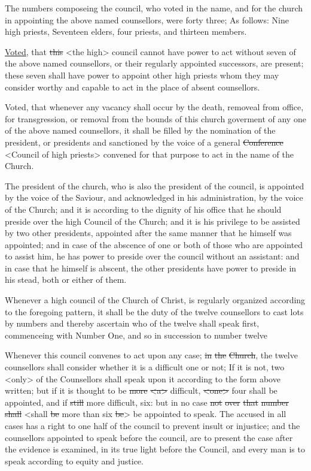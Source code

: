 					The numbers composeing the council, who voted in the name, and for the church in appointing the above named counsellors, were forty three; As follows: Nine high priests, Seventeen elders, four priests, and thirteen members.

					\uline{Voted}, that \sout{this} <the high> council cannot have power to act without seven of the above named counsellors, or their regularly appointed successors, are present; these seven shall have power to appoint other high priests whom they may consider worthy and capable to act in the place of absent counsellors.

					Voted, that whenever any vacancy shall occur by the death, removeal from office, for transgression, or removal from the bounds of this church goverment of any one of the above named counsellors, it shall be filled by the nomination of the president, or presidents and sanctioned by the voice of a general \sout{Conference} <Council of high priests> convened for that purpose to act in the name of the Church.

					The president of the church, who is also the president of the council, is appointed by the voice of the Saviour, and acknowledged in his administration, by the voice of the Church; and it is according to the dignity of his office that he should preside over the high Council of the Church; and it is his privilege to be assisted by two other presidents, appointed after the same manner that he himself was appointed; and in case of the abscence of one or both of those who are appointed to assist him, he has power to preside over the council without an assistant: and in case that he himself is abscent, the other presidents have power to preside in his stead, both or either of them.

					Whenever a high council of the Church of Christ, is regularly organized according to the foregoing pattern, it shall be the duty of the twelve counsellors to cast lots by numbers and thereby ascertain who of the twelve shall speak first, commenceing with Number One, and so in succession to number twelve

					Whenever this council convenes to act upon any case; \sout{in} \sout{the} \sout{Church}, the twelve counsellors shall consider whether it is a difficult one or not; If it is not, two <only> of the Counsellors shall speak upon it according to the form above written; but if it is thought to be \sout{more} \sout{<a>} difficult, \sout{<one>} four shall be appointed, and if \sout{still} more difficult, six: but in no case \sout{not} \sout{over} \sout{that} \sout{number} \sout{shall} <shall \sout{be} more than six \sout{be}> be appointed to speak. The accused in all cases has a right to one half of the council to prevent insult or injustice; and the counsellors appointed to speak before the council, are to present the case after the evidence is examined, in its true light before the Council, and every man is to speak according to equity and justice.

